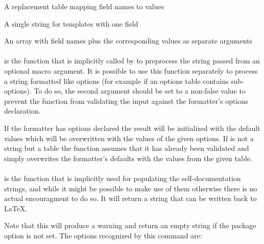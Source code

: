 \documentclass[12pt]{scrartcl}
\begin{document}
\begin{itemize*}
\item A replacement table mapping field names to values
\item A single string for templates with one field
\item An array with field names plus the corresponding values as separate
arguments
\end{itemize*}


\paragraph{}
\label{sec:advanced:formatter:check-options}

is the function that is implicitly called by  to
preprocess the string passed from an optional macro argument.  It is possible to
use this function separately to process a string formatted like options (for
example if an options table contains sub-options).  To do so, the second
argument  should be set to a non-false value to
prevent the function from validating the input against the formatter's options
declaration.

If the formatter has options declared the result will be initialized with the
default values which will be overwritten with the values of the given options.
If  is not a string but a table the function assumes that it has
already been validated and simply overwrites the formatter's defaults with the
values from the given table.


\paragraph{}
\label{sec:advanced:formatter:check-docstring}

is the function that is implicitly used for populating the self-documentation
strings, and while it might be possible to make use of them otherwise there is
no actual encouragment to do so.  It will return a string that can be written back to \LaTeX.

Note that this will produce a warning and return an empty string if the  package option is not set. The options recognized by this command are:
\end{document}
